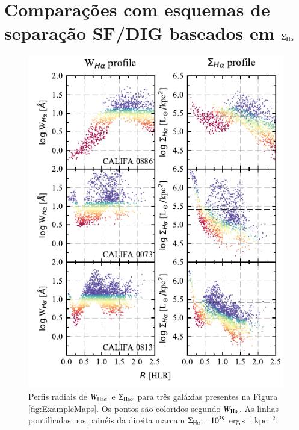\section{Comparações com esquemas de separação SF/DIG baseados em $\Sigma_{{\rm H}\alpha}$}
\label{sec:DIGdisc:compSBHa}

\begin{figure}
 \includegraphics[scale=1.7]{figuras/fig_WHaSBHa_profile_faceon_paper.pdf}
 \caption[Perfis radiais de $W_{{\rm Ha}\alpha}$ e $\Sigma_{{\rm Ha}\alpha}$]
 {Perfis radiais de $W_{{\rm Ha}\alpha}$ e $\Sigma_{{\rm Ha}\alpha}$ para três galáxias presentes na Figura \ref{fig:ExampleMaps}. Os pontos são coloridos segundo $W_{\Ha}$. As linhas pontilhadas nos painéis da direita marcam $\Sigma_{\Ha} = 10^{39}$ erg$\,$s$^{-1}\,$kpc$^{-2}$.}
 \label{fig:WHa_and_SHa_profiles}
\end{figure}

